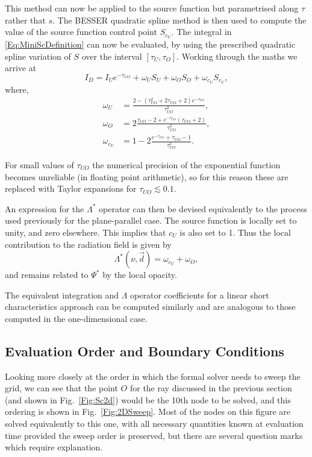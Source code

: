 This method can now be applied to the source function but parametrised along $\tau$ rather that $s$.
The BESSER quadratic spline method is then used to compute the value of the source function control point $S_{c_U}$.
The integral in \eqref{Eq:MiniScDefinition} can now be evaluated, by using the prescribed quadratic spline variation of $S$ over the interval $[\tau_{U}, \tau_{O}]$.
Working through the maths we arrive at
\begin{equation}
    I_D = I_Ue^{-\tau_{UO}} + \omega_U S_U + \omega_O S_O + \omega_{c_U} S_{c_U},
\end{equation}
where,
{
\def\edt{e^{-\tau_{UO}}}
\def\tsq{\tau_{UO}^2}
\begin{align}
    \omega_U &= \frac{2 - (\tsq + 2\tau_{UO} + 2)\edt}{\tsq},\\
    \omega_O &= 2\frac{\tau_{UO} - 2 + \edt (\tau_{UO} + 2)}{\tsq},\\
    \omega_{c_U} &= 1 - 2 \frac{\edt + \tau_{UO} - 1}{\tsq}.
\end{align}
}

For small values of $\tau_{UO}$ the numerical precision of the exponential function becomes unreliable (in floating point arithmetic), so for this reason these are replaced with Taylor expansions for $\tau_{UO}\lesssim 0.1$.

An expression for the $\Lambda^*$ operator can then be devised equivalently to the process used previously for the plane-parallel case.
The source function is locally set to unity, and zero elsewhere.
This implies that $c_U$ is also set to 1.
Thus the local contribution to the radiation field is given by
\begin{equation}
    \Lambda^*(\nu, \vec{d}) = \omega_{c_U} + \omega_O,
\end{equation}
and remains related to $\Psi^*$ by the local opacity.

The equivalent integration and $\Lambda$ operator coefficients for a linear short characteristics approach can be computed similarly and are analogous to those computed in the one-dimensional case.

\subsection{Evaluation Order and Boundary Conditions}\label{Sec:2dEvalOrder}

Looking more closely at the order in which the formal solver needs to sweep the grid, we can see that the point $O$ for the ray discussed in the previous section (and shown in Fig.~\ref{Fig:Sc2d}) would be the 10th node to be solved, and this ordering is shown in Fig.~\ref{Fig:2DSweep}.
Most of the nodes on this figure are solved equivalently to this one, with all necessary quantities known at evaluation time provided the sweep order is preserved, but there are several question marks which require explanation.

